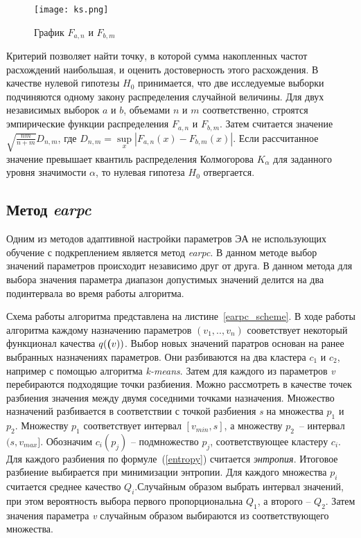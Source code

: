 \begin{figure}
    \centering
    \texttt{[image: ks.png]}
    \caption{График $F_{a, n}$ и $F_{b, m}$}
    \label{ks}
\end{figure}

Критерий позволяет найти точку, в которой сумма накопленных частот расхождений наибольшая, и оценить достоверность этого расхождения. В качестве нулевой гипотезы $H_0$ принимается, что две исследуемые выборки подчиняются одному закону распределения случайной величины. Для двух независимых выборок $a$ и $b$, объемами $n$ и $m$ соответственно, строятся эмпирические функции распределения $F_{a, n}$ и $F_{b, m}$. Затем считается значение $\sqrt{\frac{nm}{n + m}}D_{n, m}$, где $D_{n, m} = \sup\limits_x|F_{a, n}(x) - F_{b, m}(x)|$. Если рассчитанное значение превышает квантиль распределения Колмогорова $K_{\alpha}$ для заданного уровня значимости $\alpha$, то нулевая гипотеза $H_0$ отвергается.

\subsection{Метод \textit{earpc}}

Одним из методов адаптивной настройки параметров ЭА не использующих обучение с подкреплением является метод \textit{earpc}. В данном методе выбор значений параметров происходит независимо друг от друга. В данном метода для выбора значения параметра диапазон допустимых значений делится на два подинтервала во время работы алгоритма.

Схема работы алгоритма представлена на листине~\ref{earpc_scheme}. В ходе работы алгоритма каждому назначению параметров $(v_1, .., v_n)$ сооветствует некоторый функционал качества $q(\textbf(v))$. Выбор новых значений паратров основан на ранее выбранных назначениях параметров. Они разбиваются на два кластера $c_1$ и $c_2$, например с помощью алгоритма \textit{k-means}. Затем для каждого из параметров \textit{v} перебираются подходящие точки разбиения. Можно рассмотреть в качестве точек разбиения значения между двумя соседними точками назначения. Множество назначений разбивается в соответствии с точкой разбиения \textit{s} на множества $p_1$ и $p_2$. Множеству $p_1$ соответствует интервал $[v_{min}, s]$, а множеству $p_2$~-- интервал $(s, v_{max}]$. Обозначим $c_i(p_j)$ -- подмножество $p_j$, соответствующее кластеру $c_i$. Для каждого разбиения по формуле~(\ref{entropy}) считается \textit{энтропия}. Итоговое разбиение выбирается при минимизации энтропии. Для каждого множества $p_i$ считается среднее качество $Q_i$.Случайным образом выбрать интервал значений, при этом вероятность выбора первого пропорциональна $Q_1$, а второго -- $Q_2$. Затем значения параметра \textit{v} случайным образом выбираются из соответствующего множества.

